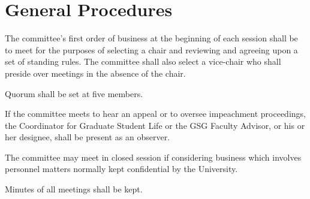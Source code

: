 \section{General Procedures}
\begin{bylaws-number}
  \item The committee’s first order of business at the beginning of each session shall be to meet for the purposes of selecting a chair and reviewing and agreeing upon a set of standing rules. The committee shall also select a vice-chair who shall preside over meetings in the absence of the chair.
  \item Quorum shall be set at five members.
  \item If the committee meets to hear an appeal or to oversee impeachment proceedings, the Coordinator for Graduate Student Life or the GSG Faculty Advisor, or his or her designee, shall be present as an observer.
  \item The committee may meet in closed session if considering business which involves personnel matters normally kept confidential by the University.
  \item Minutes of all meetings shall be kept.
\end{bylaws-number}

